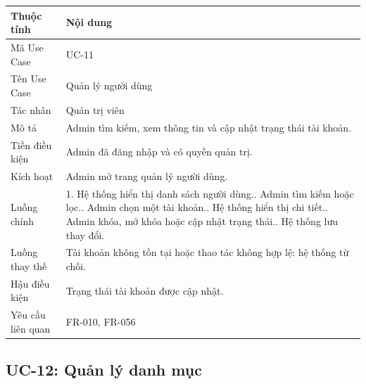 \begin{longtable}{|p{3.5cm}|p{10.2cm}|}
\hline
\textbf{Thuộc tính} & \textbf{Nội dung} \\ \hline
Mã Use Case & UC-11 \\ \hline
Tên Use Case & Quản lý người dùng \\ \hline
Tác nhân & Quản trị viên \\ \hline
Mô tả & Admin tìm kiếm, xem thông tin và cập nhật trạng thái tài khoản. \\ \hline
Tiền điều kiện & Admin đã đăng nhập và có quyền quản trị. \\ \hline
Kích hoạt & Admin mở trang quản lý người dùng. \\ \hline
Luồng chính &
1. Hệ thống hiển thị danh sách người dùng.\newline
2. Admin tìm kiếm hoặc lọc.\newline
3. Admin chọn một tài khoản.\newline
4. Hệ thống hiển thị chi tiết.\newline
5. Admin khóa, mở khóa hoặc cập nhật trạng thái.\newline
6. Hệ thống lưu thay đổi. \\ \hline
Luồng thay thế & Tài khoản không tồn tại hoặc thao tác không hợp lệ: hệ thống từ chối. \\ \hline
Hậu điều kiện & Trạng thái tài khoản được cập nhật. \\ \hline
Yêu cầu liên quan & FR-010, FR-056 \\ \hline
\end{longtable}

\subsection{UC-12: Quản lý danh mục}

